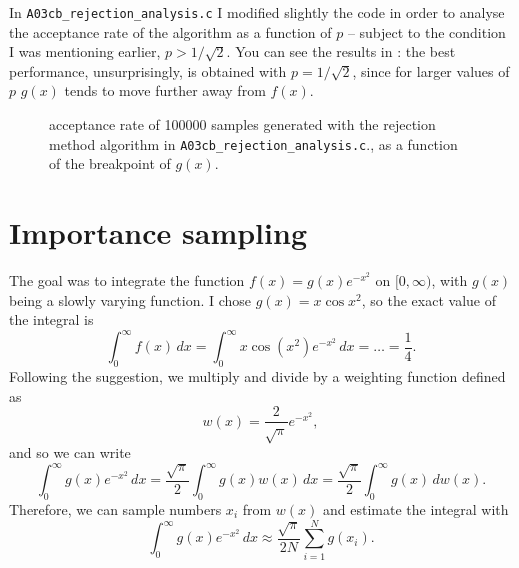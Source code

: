 \documentclass{gulartcl}
\begin{document}
In \texttt{A03cb\_rejection\_analysis.c} I modified slightly the code in order
to analyse the acceptance rate of the algorithm as a function of $p$ – subject
to the condition I was mentioning earlier, $p > 1 / \sqrt{2}$. You can see the
results in : the best performance, unsurprisingly, is obtained
with $p = 1 / \sqrt{2}$, since for larger values of $p$ $g(x)$ tends to move
further away from $f(x)$.

\begin{figure}
    \centering
    
    \caption{acceptance rate of \num{100000} samples generated with the
        rejection method algorithm in \texttt{A03cb\_rejection\_analysis.c}., as
        a function of the breakpoint of $g(x)$.}
    \label{fig:A03cb}
\end{figure}

\section{Importance sampling}
The goal was to integrate the function $f(x) = g(x) e^{-x^{2}}$ on $[0,
\infty)$, with $g(x)$ being a slowly varying function. I chose $g(x) = x
\cos x^{2}$, so the exact value of the integral is
\begin{equation}
    \int_{0}^{\infty} f(x) \, dx = \int_{0}^{\infty} x \cos(x^2) e^{-x^{2}}\, dx
        = \dots = \frac{1}{4}.
\end{equation}
Following the suggestion, we multiply and divide by a weighting function defined
as
\begin{equation}
    w(x) = \frac{2}{\sqrt{\pi}} e^{-x^{2}},
\end{equation}
and so we can write
\begin{equation}
    \int_{0}^{\infty} g(x) e^{-x^{2}} \, dx = \frac{\sqrt{\pi}}{2} \int_{0}^{\infty} 
        g(x) w(x) \, dx = \frac{\sqrt{\pi}}{2} \int_{0}^{\infty} g(x) \, dw(x).
\end{equation}
Therefore, we can sample numbers $x_i$ from $w(x)$ and estimate the integral
with
\begin{equation}
    \int_{0}^{\infty} g(x) e^{-x^{2}} \, dx \approx \frac{\sqrt{\pi}}{2N}
        \sum_{i = 1}^{N} g(x_i).
\end{equation}
\end{document}
